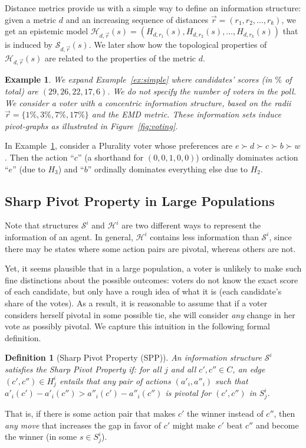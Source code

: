 \documentclass[letterpaper]{article} %
\def\calS{\mathcal{S}}
\def\calH{\mathcal{H}}
\newtheorem{example}[theorem]{Example}
\newtheorem{definition}{Definition}
\begin{document}
	
Distance metrics provide us with a simple way to define an information structure: given a metric $d$ and an increasing sequence of distances $\vec r = (r_1,r_2,\ldots,r_k)$, we get an epistemic model $\calH_{d,\vec r}(s) = (H_{d,r_1}(s),H_{d,r_2}(s),\ldots,H_{d,r_k}(s))$ that is induced by $\calS_{d,\vec r}(s)$. We later show how the topological properties of $\calH_{d,\vec r}(s)$ are related to the properties of the metric $d$.

\begin{example}\label{ex:voting} We expand Example~\ref{ex:simple} where candidates' scores (in $\%$ of total) are $(29,26,22,17,6)$. We do not specify the number of voters in the poll. We consider a voter with a concentric information structure, based on the radii $\vec r= \{1\%,3\%,7\%,17\%\}$ and the EMD metric. These information sets induce pivot-graphs as illustrated in Figure~\ref{fig:voting}. 
\end{example}

In Example~\ref{ex:voting}, consider a Plurality voter whose preferences are $e\succ d\succ c\succ b\succ w$. Then the action ``$c$'' (a shorthand for $(0,0,1,0,0)$) ordinally dominates action ``$e$'' (due to $H_3$) and ``$b$'' ordinally dominates everything else due to $H_2$.


\subsection{Sharp Pivot Property in Large Populations}
Note that structures $\calS^i$ and $\calH^i$ are two different ways to represent the information of an agent. In general, $\calH^i$ contains less information than $\calS^i$, since there may be states where some action pairs are pivotal, whereas others are not. 

Yet, it seems plausible that in a large population, a voter is unlikely to make such fine distinctions about the possible outcomes: voters do not know the exact score of each candidate, but only have a rough idea of what it is (each candidate's share of the votes). As a result, it is reasonable to assume that if a voter considers herself pivotal in some possible tie, she will consider \emph{any} change in her vote as possibly pivotal. We capture this intuition in the following formal definition.


\begin{definition}[Sharp Pivot Property (SPP)]\label{def:pivot}
An information structure $\calS^i$ satisfies the \emph{Sharp Pivot Property} if:
for all $j $ and all $c',c''\in C$, an edge $(c',c'')\in H^i_j$ entails that any pair of actions $(a'_i,a''_i)$ such that $a'_i(c')-a'_i(c'') > a''_i(c')-a''_i(c'')$ is pivotal for $(c',c'')$ in $S^i_j$. 
\end{definition}
That is, if there is some action pair that makes $c'$ the winner instead of $c''$, then \emph{any move} that increases the gap in favor of $c'$ might make $c'$ beat $c''$ and become the winner (in some $s\in S^i_j$). 
\end{document}
